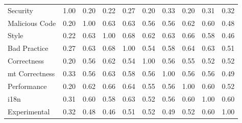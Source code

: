 
\begin{tabular}{lccccccccc}
\hline
Security & 1.00 & 0.20 & 0.22 & 0.27 & 0.20 & 0.33 & 0.20 & 0.31 & 0.32\\
Malicious Code & 0.20 & 1.00 & 0.63 & 0.63 & 0.56 & 0.56 & 0.62 & 0.60 & 0.48\\
Style & 0.22 & 0.63 & 1.00 & 0.68 & 0.62 & 0.63 & 0.66 & 0.58 & 0.46\\
Bad Practice & 0.27 & 0.63 & 0.68 & 1.00 & 0.54 & 0.58 & 0.64 & 0.63 & 0.51\\
Correctness & 0.20 & 0.56 & 0.62 & 0.54 & 1.00 & 0.56 & 0.55 & 0.52 & 0.52\\
{\sc mt} Correctness & 0.33 & 0.56 & 0.63 & 0.58 & 0.56 & 1.00 & 0.56 & 0.56 & 0.49\\
Performance & 0.20 & 0.62 & 0.66 & 0.64 & 0.55 & 0.56 & 1.00 & 0.60 & 0.52\\
i18n & 0.31 & 0.60 & 0.58 & 0.63 & 0.52 & 0.56 & 0.60 & 1.00 & 0.60\\
Experimental & 0.32 & 0.48 & 0.46 & 0.51 & 0.52 & 0.49 & 0.52 & 0.60 & 1.00\\
\hline
\end{tabular}
